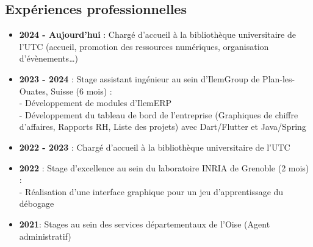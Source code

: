 \documentclass[9pt, oneside, a4paper, titlepage]{extarticle}
\begin{document}
\begin{tcolorbox}
\begin{minipage}[t]{12.8cm}
\begin{tcolorbox}[grow to right by = 0.6cm, colback = gray!25, colframe = white]
                \section*{Expériences professionnelles}
                \begin{itemize}
                    \item \textbf{2024 - Aujourd'hui }: Chargé d'accueil à la bibliothèque universitaire de l'UTC (accueil, promotion des ressources numériques, organisation d'évènements\ldots)
                    \item \textbf{2023 - 2024 }: Stage assistant ingénieur au sein d'IlemGroup de Plan-les-Ouates, Suisse (6 mois) : \\
                    - Développement de modules d'IlemERP \\
                    - Développement du tableau de bord de l'entreprise (Graphiques de chiffre d'affaires, Rapports RH, Liste des projets) avec Dart/Flutter et Java/Spring
                    \item \textbf{2022 - 2023 }: Chargé d'accueil à la bibliothèque universitaire de l'UTC
                    \item \textbf{2022 }: Stage d'excellence au sein du laboratoire INRIA 
                    de Grenoble (2 mois) : \\   - Réalisation d'une 
                    interface graphique pour un jeu d'apprentissage
                    du débogage
                    \item \textbf{2021}: Stages au sein des services départementaux de l’Oise (Agent administratif)
                    
                \end{itemize}


\end{tcolorbox}
\end{minipage}
\end{tcolorbox}
\end{document}
